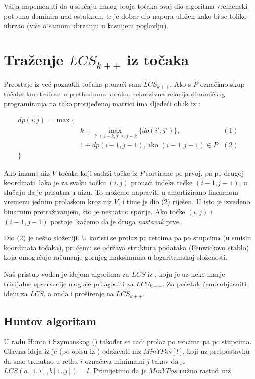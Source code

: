 \documentclass[times, utf8, seminar, numeric]{fer}
\begin{document}
Valja napomenuti da u slučaju malog broja točaka ovaj dio algoritma
vremenski potpuno dominira nad ostatkom, te je dobar dio napora uložen
kako bi se toliko ubrzao (više o samom ubrzanju u kasnijem poglavlju).

\section{Traženje $LCS_{k++}$ iz točaka}
Preostaje iz već poznatih točaka pronaći sam $LCS_{k++}$. Ako s $P$
označimo skup točaka konstruiran u prethodnom koraku, rekurzivna
relacija dinamičkog programiranja na tako prorijeđenoj matrici ima
sljedeći oblik iz \cite{Pavetic}:


\begin{align*}
dp(i, j) = \max\{ \\
  &k + \max_{i' \le i - k, j' \le j - k}\{dp(i', j')\},    &      (1) \\ 
  &1 + dp(i-1, j-1) \text{, ako } (i-1, j-1) \in P     &       (2)\\
  \}
\end{align*}

Ako imamo niz $V$ točaka koji sadrži točke iz $P$ sortirane po prvoj,
pa po drugoj koordinati, lako je za svaku točku $(i, j)$ pronaći
indeks točke $(i-1, j-1)$, u slučaju da je prisutna u nizu. To možemo
napraviti u amortizirano linearnom vremenu jednim prolaskom kroz niz
$V$, i time je dio (2) riješen. U \cite{Pavetic} isto je izvedeno
binarnim pretraživanjem, što je neznatno sporije. Ako točke $(i, j)$ i
$(i-1, j-1)$ postoje, kažemo da je druga \emph{nastavak} prve.

Dio (2) je nešto složeniji. U \cite{Pavetic} koristi se prolaz po retcima
pa po stupcima (u smislu koordinata točaka), pri čemu se održava
struktura podataka (Fenwickovo stablo) koja omogućuje računanje gornjeg
maksimuma u logaritamskoj složenosti. 

Naš pristup vođen je idejom algoritma za $LCS$ iz \cite{Hunt}, koju je uz neke
manje trivijalne opservacije moguće prilagoditi za $LCS_{k++}$. Za početak
ćemo objasniti ideju za $LCS$, a onda i proširenje na $LCS_{k++}$.

\subsection{Huntov algoritam}
U radu Hunta i Szymanskog (\cite{Hunt}) također se radi prolaz po
retcima pa po stupcima. Glavna ideja iz je (po opisu iz \cite{Survey})
održavati niz $MinYPos[l]$, koji uz pretpostavku da smo trenutno u
retku $i$ označava minimalni $j$ takav da je $LCS(a[1..i], b[1..j]) =
l$. Primijetimo da je $MinYPos$ nužno rastući niz.
\end{document}

